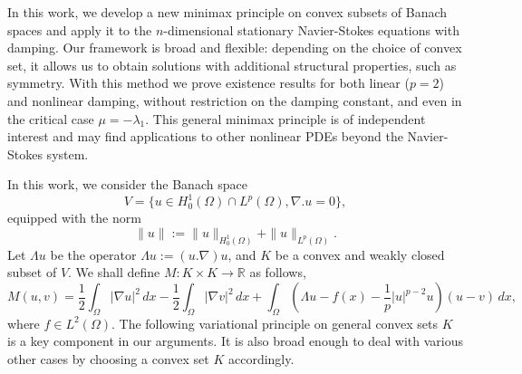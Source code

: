 \documentclass[reqno]{amsart}
\begin{document}
In this work, we develop a new minimax principle on convex subsets of Banach spaces and
apply it to the $n$-dimensional stationary Navier-Stokes equations with damping.
Our framework is broad and flexible: depending on the choice of convex set, it allows
us to obtain solutions with additional structural properties, such as symmetry.
With this method we prove existence results for both linear ($p=2$) and nonlinear
damping, without restriction on the damping constant, and even in the critical case
$\mu = -\lambda_1$. This general minimax principle is of independent interest and may
find applications to other nonlinear PDEs beyond the Navier-Stokes system.

In this work,  we  consider the Banach space
\[
V= \{ u\in H_0^1(\Omega)\cap L^p(\Omega),\nabla . u=0\},
\]
equipped with the  norm
\[
\rVert u \rVert:= \rVert u \rVert_{ H_0^{1}(\Omega)}
+\rVert u \rVert_{ L^{p}(\Omega)}.
\]
Let \(\Lambda u\) be the operator \(\Lambda u := (u . \nabla)u\),
and \( K\) be a convex and weakly closed subset of \(V\).
We shall define \( M : K \times K \to\mathbb{R}\) as follows,
\begin{equation}\label{def II}
    M(u,v)=\frac{1}{2}\int_{\Omega} |\nabla u|^2\,dx
    -\frac{1}{2}\int_{\Omega} |\nabla v|^2\,dx
    +\int_\Omega (\Lambda u-f(x)  -\frac{1}{p}|u|^{p-2}u) (u-v)\,dx,
\end{equation}
where \(f \in L^2(\Omega)\). The following variational principle on general convex
sets $K$  is a  key component in our arguments. It is also broad enough to deal with
various other cases by choosing a convex set $K$ accordingly.
\end{document}
